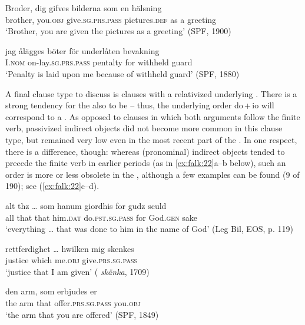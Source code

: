 \documentclass[output=paper]{langscibook}
\begin{document}
\ea%
    \label{ex:falk:21}
\ea \label{ex:falk:21a}
\gll Broder,  dig    gifves            bilderna      som  en  hälsning\\
      brother,  you.\textsc{obj}  give.\textsc{sg.prs.pass}  pictures\textsc{.def}  as    a  greeting\\
\glt ‘Brother, you are given the pictures as a greeting’ (SPF, 1900)

\ex \label{ex:falk:21b}
\gll jag      ålägges          böter      för    underlåten  bevakning\\
      I.\textsc{nom}  on-lay.\textsc{sg.prs.pass}  pentalty  for    withheld   guard\\
\glt ‘Penalty is laid upon me because of withheld guard’ (SPF, 1880)
\z
\z

A final clause type to discuss is clauses with a relativized underlying . There is a strong tendency for the  also to be  – thus, the underlying order do\,+\,io will correspond to a . As opposed to clauses in which both arguments follow the finite verb, passivized indirect objects did not become more common in this clause type, but remained very low even in the most recent part of the . In one respect, there is a difference, though: whereas (pronominal) indirect objects tended to precede the finite verb in earlier periods (as in \ref{ex:falk:22}a–b below), such an order is more or less obsolete in the , although a few examples can be found (9 of 190); see (\ref{ex:falk:22}c–d).


\ea%
    \label{ex:falk:22}
\ea\label{ex:falk:22a}
\gll alt  thz …    som  hanum    giordhis          for    gudz      sculd\\
      all  that {}  that  him\textsc{.dat}    do\textsc{.pst.sg.pass}  for    God.\textsc{gen}  sake\\
\glt ‘everything … that was done to him in the name of God’ (Leg Bil, EOS, p. 119)

\ex\label{ex:falk:22b}
\gll rettferdighet … hwilken  mig    skenkes\\
      justice {}      which    me\textsc{.obj}   give\textsc{.prs.sg.pass}\\
\glt ‘justice that I am given’ ( \textit{skänka}, 1709)

\ex\label{ex:falk:22c}
\gll den  arm,  som  erbjudes            er\\
      the  arm  that  offer\textsc{.prs.sg.pass}     you.\textsc{obj}\\
\glt ‘the arm that you are offered’ (SPF, 1849)
\end{document}
